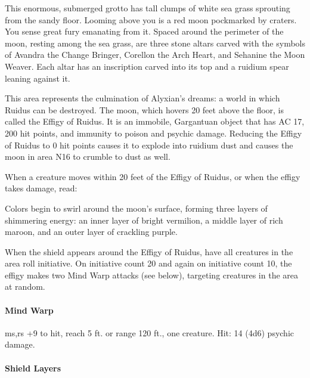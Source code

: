 \documentclass[a4paper, 11pt, bg=full, twocolumn, nooutline]{dndbook}
\begin{document}
\begin{DndReadAloud}
This enormous, submerged grotto has tall clumps of white sea grass sprouting from the sandy floor. Looming above you is a red moon pockmarked by craters. You sense great fury emanating from it.
Spaced around the perimeter of the moon, resting among the sea grass, are three stone altars carved with the symbols of Avandra the Change Bringer, Corellon the Arch Heart, and Sehanine the Moon Weaver. Each altar has an inscription carved into its top and a ruidium spear leaning against it.
\end{DndReadAloud}

This area represents the culmination of Alyxian's dreams: a world in which Ruidus can be destroyed. The moon, which hovers 20 feet above the floor, is called the Effigy of Ruidus. It is an immobile, Gargantuan object that has AC 17, 200 hit points, and immunity to poison and psychic damage. Reducing the Effigy of Ruidus to 0 hit points causes it to explode into ruidium dust and causes the moon in area N16 to crumble to dust as well.

When a creature moves within 20 feet of the Effigy of Ruidus, or when the effigy takes damage, read:

\begin{DndReadAloud}
Colors begin to swirl around the moon's surface, forming three layers of shimmering energy: an inner layer of bright vermilion, a middle layer of rich maroon, and an outer layer of crackling purple.
\end{DndReadAloud}

When the shield appears around the Effigy of Ruidus, have all creatures in the area roll initiative. On initiative count 20 and again on initiative count 10, the effigy makes two Mind Warp attacks (see below), targeting creatures in the area at random.

\begin{DndSidebar}{}
\paragraph{Mind Warp}

ms,rs +9 to hit, reach 5 ft. or range 120 ft., one creature. Hit: 14 (4d6) psychic damage.
\end{DndSidebar}

\paragraph{Shield Layers}
\end{document}
